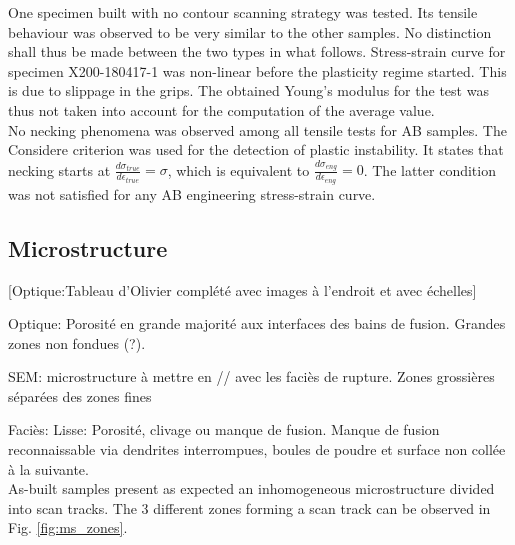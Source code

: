 One specimen built with no contour scanning strategy was tested. Its tensile behaviour was observed to be very similar to the other samples. No distinction shall thus be made between the two types in what follows. Stress-strain curve for specimen X200-180417-1 was non-linear before the plasticity regime started. This is due to slippage in the grips. The obtained Young's modulus for the test was thus not taken into account for the computation of the average value.\\

No necking phenomena was observed among all tensile tests for AB samples. The Considere criterion was used for the detection of plastic instability. It states that necking starts at $\frac{d\sigma_{true}}{d\epsilon_{true}}=\sigma$, which is equivalent to $\frac{d\sigma_{eng}}{d\epsilon_{eng}}=0$. The latter condition was not satisfied for any AB engineering stress-strain curve.\\

\subsection{Microstructure}

[Optique:Tableau d'Olivier complété avec images à l'endroit et avec échelles] 

Optique: Porosité en grande majorité aux interfaces des bains de fusion. Grandes zones non fondues (?).

SEM: microstructure à mettre en // avec les faciès de rupture. Zones grossières séparées des zones fines

Faciès: 
Lisse: Porosité, clivage ou manque de fusion. Manque de fusion reconnaissable via dendrites interrompues, boules de poudre et surface non collée à la suivante.\\

As-built samples present as expected an inhomogeneous microstructure divided into scan tracks. The 3 different zones forming a scan track can be observed in Fig. \ref{fig:ms_zones}.\\

